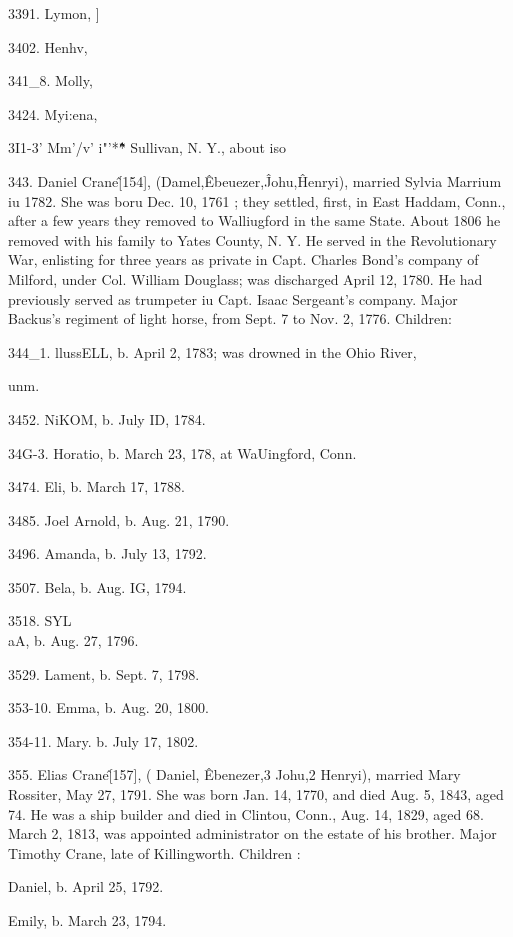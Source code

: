 \documentclass{book}
\begin{document}
3391. Lymon, ] 

3402. Henhv, 

341\_8. Molly, 

3424. Myi:ena, 



3I1-3' Mm'/v' i"'*\^\^\^ \^\^\^ * Sullivan, N. Y., about iso 




343. Daniel Crane\^ [154], (Damel,\^ Ebeuezer,\^ Johu,\^ 
Henryi), married Sylvia Marrium iu 1782. She was boru Dec. 
10, 1761 ; they settled, first, in East Haddam, Conn., after a few 
years they removed to Walliugford in the same State. About 
1806 he removed with his family to Yates County, N. Y. He 
served in the Revolutionary War, enlisting for three years as 
private in Capt. Charles Bond's company of Milford, under Col. 
William Douglass; was discharged April 12, 1780. He had 
previously served as trumpeter iu Capt. Isaac Sergeant's company. 
Major Backus's regiment of light horse, from Sept. 7 to Nov. 2, 
1776. Children: 

344\_1. llussELL, b. April 2, 1783; was drowned in the Ohio River, 

unm. 

3452. NiKOM, b. July ID, 1784. 

34G-3. Horatio, b. March 23, 178, at WaUingford, Conn. 

3474. Eli, b. March 17, 1788. 

3485. Joel Arnold, b. Aug. 21, 1790. 

3496. Amanda, b. July 13, 1792. 

3507. Bela, b. Aug. IG, 1794. 

3518. SYL\\aA, b. Aug. 27, 1796. 

3529. Lament, b. Sept. 7, 1798. 

353-10. Emma, b. Aug. 20, 1800. 

354-11. Mary. b. July 17, 1802. 

355. Elias Crane\^ [157], ( Daniel, \^ Ebenezer,3 Johu,2 
Henryi), married Mary Rossiter, May 27, 1791. She was born 
Jan. 14, 1770, and died Aug. 5, 1843, aged 74. He was a ship 
builder and died in Clintou, Conn., Aug. 14, 1829, aged 68. 
March 2, 1813, was appointed administrator on the estate of his 
brother. Major Timothy Crane, late of Killingworth. Children : 

Daniel, b. April 25, 1792. 

Emily, b. March 23, 1794. 
\end{document}
